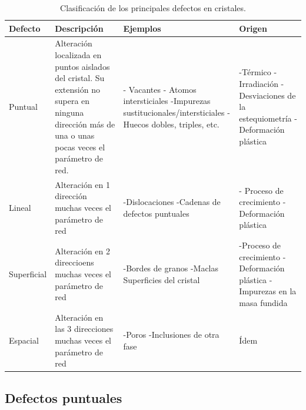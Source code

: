 \begin{table}[h!] \centering
    \begin{tabular}{m{2cm} | m{4cm} | m{4cm} | m{4cm}}
        Defecto & Descripción & Ejemplos & Origen \\ \hline \hline
        Puntual & Alteración localizada en puntos aislados del cristal. Su extensión no supera en ninguna dirección más de una o unas pocas veces el parámetro de red. & - Vacantes \newline - Atomos intersticiales \newline -Impurezas sustitucionales/intersticiales \newline -Huecos dobles, triples, etc. & -Térmico \newline -Irradiación \newline -Desviaciones de la estequiometría \newline -Deformación plástica \\ \hline
        Lineal & Alteración en 1 dirección muchas veces el parámetro de red & -Dislocaciones \newline -Cadenas de defectos puntuales & - Proceso de crecimiento \newline -Deformación plástica \\ \hline
        Superficial & Alteración en 2 direccioens muchas veces el parámetro de red & -Bordes de granos \newline -Maclas \newline Superficies del cristal & -Proceso de crecimiento \newline -Deformación plástica \newline -Impurezas en la masa fundida \\ \hline
        Espacial & Alteración en las 3 direcciones muchas veces el parámetro de red & -Poros \newline -Inclusiones de otra fase & Ídem \\ \hline
    \end{tabular}
    \caption{Clasificación de los principales defectos en cristales.}
    \label{Tab:01-02}
\end{table}





\subsection{Defectos puntuales} \label{Subsec:01-06-01}

